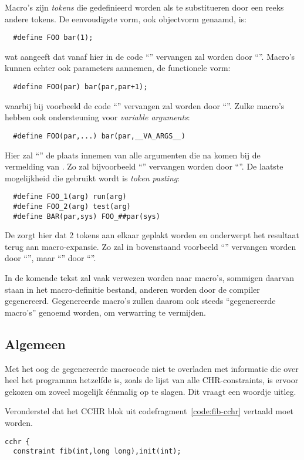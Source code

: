 {Macro's zijn {\em tokens} die gedefinieerd worden als te substitueren door een reeks andere tokens. De eenvoudigste vorm, ook objectvorm genaamd, is: \begin{Verbatim}
  #define FOO bar(1);
\end{Verbatim}
wat aangeeft dat vanaf hier in de code ``'' vervangen zal worden door ``''. Macro's kunnen echter ook parameters aannemen, de functionele vorm: \begin{Verbatim}
  #define FOO(par) bar(par,par+1);
\end{Verbatim}
waarbij bij voorbeeld de code ``'' vervangen zal worden door ``''. Zulke macro's hebben ook ondersteuning voor {\em variable arguments}: \begin{Verbatim}
  #define FOO(par,...) bar(par,__VA_ARGS__)
\end{Verbatim}
Hier zal ``'' de plaats innemen van alle argumenten die na  komen bij de vermelding van . Zo zal bijvoorbeeld ``'' vervangen worden door ``''. De laatste mogelijkheid die gebruikt wordt is {\em token pasting}: \begin{Verbatim}
  #define FOO_1(arg) run(arg)
  #define FOO_2(arg) test(arg)
  #define BAR(par,sys) FOO_##par(sys)
\end{Verbatim}
De \code{\#\#} zorgt hier dat 2 tokens aan elkaar geplakt worden en onderwerpt het resultaat terug aan macro-expansie. Zo zal in bovenstaand voorbeeld ``'' vervangen worden door ``'', maar ``'' door ``''.

In de komende tekst zal vaak verwezen worden naar macro's, sommigen daarvan staan in het macro-definitie bestand, anderen worden door de compiler gegenereerd. Gegenereerde macro's zullen daarom ook steeds ``gegenereerde macro's'' genoemd worden, om verwarring te vermijden.

\subsection{Algemeen} \label{sec:gencode-alg}

Met het oog de gegenereerde macrocode niet te overladen met informatie die over heel het programma hetzelfde is, zoals de lijst van alle CHR-constraints, is ervoor gekozen om zoveel mogelijk \'e\'enmalig op te slagen. Dit vraagt een woordje uitleg.

Veronderstel dat het CCHR blok uit codefragment~\ref{code:fib-cchr} vertaald moet worden.
\begin{exCode}
\begin{Verbatim}[frame=single]
cchr {
  constraint fib(int,long long),init(int);


\end{Verbatim}
\end{exCode}}
